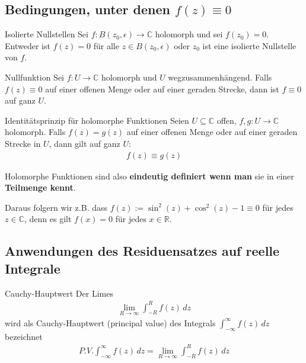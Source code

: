 \documentclass[a4paper,10pt]{article}
\def\R{\mathbb{R}}
\def\C{\mathbb{C}}
\begin{document}
\subsection{Bedingungen, unter denen $f(z) \equiv 0$}

\begin{mainbox}{Isolierte Nullstellen}
  Sei \(f\colon B(z_0,\epsilon)\to\mathbb{C}\) holomorph und sei \(f(z_0)=0\). Entweder ist \(f(z) = 0\) für alle \(z \in B(z_0,\epsilon)\) oder \(z_0\) ist eine isolierte Nullstelle von \(f\).
\end{mainbox}

\begin{subbox}{Nullfunktion}
  Sei \(f\colon U\to \mathbb{C}\) holomorph und \(U\) wegzusammenhängend. Falls \(f(z)\equiv0\) auf einer offenen Menge oder auf einer geraden Strecke, dann ist \(f\equiv0\) auf ganz \(U\).
\end{subbox}

\begin{mainbox}{Identitätsprinzip für holomorphe Funktionen}
  Seien \(U\subseteq \mathbb{C}\) offen, \(f,g \colon U \to \mathbb{C}\) holomorph. Falls \(f(z) = g(z)\) auf einer offenen Menge oder auf einer geraden Strecke in \(U\), dann gilt auf ganz $U$: \begin{align*}f(z)\equiv g(z)\end{align*}
\end{mainbox}

Holomorphe Funktionen sind also \textbf{eindeutig definiert wenn man} sie in einer \textbf{Teilmenge kennt}.

Daraus folgern wir z.B. dass $f(z) := \sin^2(z) + \cos^2(z) - 1 \equiv 0$ für jedes $z \in \C$, denn es gilt $f(x) = 0$ für jedes $x \in \R$.

\subsection{Anwendungen des Residuensatzes auf reelle Integrale}

\begin{subbox}{Cauchy-Hauptwert}
  Der Limes \begin{align*} \lim_{R\to\infty}\int_{-R}^Rf(z)\,dz \end{align*} wird als Cauchy-Hauptwert (principal value) des Integrals \(\int_{-\infty}^\infty f(z)\,dz\) bezeichnet \begin{align*} P.V.\int_{-\infty}^\infty f(z)\,dz=\lim_{R\to\infty}\int_{-R}^Rf(z)\,dz \end{align*}
\end{subbox}
\end{document}
